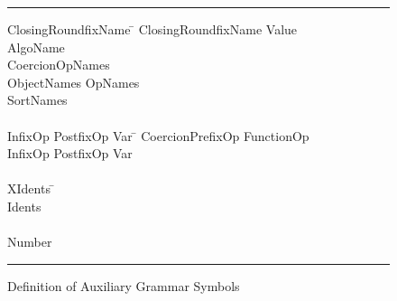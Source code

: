 \begin{figure}[htbp]
\begin{center}
\noindent
\rule{\textwidth}{0.6pt}

\begin{minipage}{6in}
\begin{tabbing}
{\vs ClosingRoundfixName}    \= \kill
{\vs ClosingRoundfixName}   \gsep 
   {\vs Value} \>  \\
{\vs AlgoName}    \>  \\
{\vs CoercionOpNames}  \gsep \\
   {\vs ObjectNames} \gsep
   {\vs OpNames}  \>  \\
{\vs SortNames}  \>  \\
\\
{\vs InfixOp}  \gsep 
   {\vs PostfixOp}   \gsep
   {\vs Var} \= \kill
{\vs CoercionPrefixOp}   \gsep
   {\vs FunctionOp} \gsep \\
   {\vs InfixOp}  \gsep 
   {\vs PostfixOp}   \gsep
   {\vs Var} \>  \\
\\
{\vs XIdents} \=   \\
{\vs Idents} \>   \\
\\
{\vs Number} \> \gprod {}
\end{tabbing}
\end{minipage}

\noindent
\rule{\textwidth}{0.6pt}
\caption{Definition of Auxiliary Grammar Symbols}
\label{axgram}
\end{center}
\end{figure}